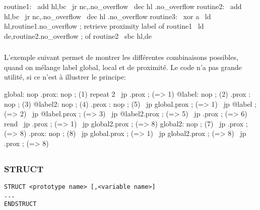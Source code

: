 \begin{code}
routine1:
\ add hl,bc
\ jr nc,.no\_overflow
\ dec hl
.no\_overflow
\medskip
routine2:
\ add hl,bc
\ jr nc,.no\_overflow
\ dec hl
.no\_overflow
\medskip
routine3:
\ xor a
\ ld hl,routine1.no\_overflow ; retrieve proximity label of routine1
\ ld de,routine2.no\_overflow ; of routine2
\ sbc hl,de
\end{code}

\subsubsection{}

\begin{xfr}
L'exemple suivant permet de montrer les différentes combinaisons possibles, quand on mélange label global, local et de proximité. 
Le code n'a pas grande utilité, si ce n'est à illustrer le principe:
\end{xfr}

\begin{code}
  global: nop
  .prox:  nop ; (1)
  \medskip
  repeat 2
  \           jp .prox ;  (=> 1)
  @label:   nop  ; (2)
  .prox :   nop  ; (3)
  @label2:  nop  ; (4)
  .prox :   nop  ; (5) 
  \           jp global.prox  ; (=> 1)
  \           jp @label       ; (=> 2)
  \           jp @label.prox  ; (=> 3)
  \           jp @label2.prox ; (=> 5)
  \           jp .prox        ; (=> 6)
  rend
  \medskip
  \           jp .prox        ; (=> 1) 
  \           jp global2.prox ; (=> 8)
  \medskip
  global2:    nop  ; (7)
  \           jp .prox        ; (=> 8) 
  .prox:      nop ; (8)
  \           jp global.prox  ; (=> 1)
  \           jp global2.prox ; (=> 8)
  \           jp .prox        ; (=> 8) 
  \end{code}
  

\subsection{}

\subsubsection{STRUCT}  
\begin{verbatim}
STRUCT <prototype name> [,<variable name>]
...
ENDSTRUCT

\end{verbatim}

